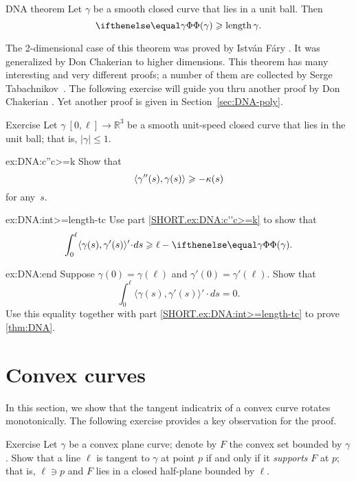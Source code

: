 \begin{thm}{DNA theorem}\label{thm:DNA}
Let $\gamma$ be a smooth closed curve that lies in a unit ball.
Then 
\[\tc\gamma\ge \length\gamma.\]

\end{thm}

The 2-dimensional case of this theorem was proved by Istv\'{a}n F\'{a}ry \cite{fary1950}.
It was generalized by Don Chakerian \cite{chakerian1962} to higher dimensions.
This theorem has many interesting and very different proofs;
a number of them are collected by Serge Tabachnikov~\cite{tabachnikov}.
The following exercise will guide you thru another proof by Don Chakerian \cite{chakerian1964}.
Yet another proof is given in Section~\ref{sec:DNA-poly}.

\begin{thm}{Exercise}\label{ex:DNA}
Let $\gamma\:[0,\ell]\to\mathbb{R}^3$ be a smooth unit-speed closed curve that lies in the unit ball; that is, $|\gamma|\le 1$.

\begin{subthm}{ex:DNA:c''c>=k}
Show that 
\[\langle\gamma''(s),\gamma(s)\rangle\geqslant-\kappa(s)\]
for any~$s$.
\end{subthm}

\begin{subthm}{ex:DNA:int>=length-tc}
Use part \ref{SHORT.ex:DNA:c''c>=k} to show that 
\[\int_0^\ell\langle\gamma(s),\gamma'(s)\rangle'\cdot ds\ge
\ell-\tc\gamma.\]

\end{subthm}

\begin{subthm}{ex:DNA:end}
Suppose $\gamma(0)=\gamma(\ell)$ and $\gamma'(0)=\gamma'(\ell)$.
Show that 
\[\int_0^\ell\langle\gamma(s),\gamma'(s)\rangle'\cdot ds=0.\]
Use this equality together with  part \ref{SHORT.ex:DNA:int>=length-tc} to prove \ref{thm:DNA}.
\end{subthm}
\end{thm}

\section{Convex curves}

In this section, we show that the tangent indicatrix of a convex curve rotates monotonically. 
The following exercise provides a key observation for the proof.

\begin{thm}{Exercise}\label{ex:tangent-support}
Let $\gamma$ be a convex plane curve;
denote by $F$ the convex set bounded by $\gamma$.
Show that a line $\ell$ is tangent to $\gamma$ at point $p$ if and only if it \emph{supports} $F$ at $p$;
that is, $\ell\ni p$ and $F$ lies in a closed half-plane bounded by $\ell$.
\end{thm}

